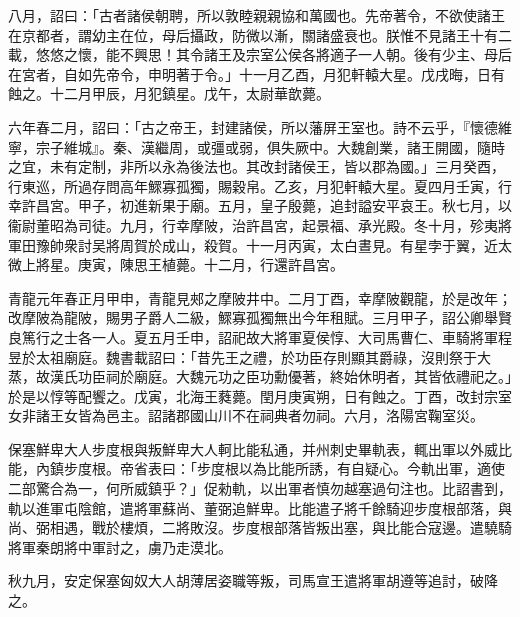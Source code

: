 \begin{pinyinscope}
八月，詔曰：「古者諸侯朝聘，所以敦睦親親協和萬國也。先帝著令，不欲使諸王在京都者，謂幼主在位，母后攝政，防微以漸，關諸盛衰也。朕惟不見諸王十有二載，悠悠之懷，能不興思！其令諸王及宗室公侯各將適子一人朝。後有少主、母后在宮者，自如先帝令，申明著于令。」十一月乙酉，月犯軒轅大星。戊戌晦，日有蝕之。十二月甲辰，月犯鎮星。戊午，太尉華歆薨。

六年春二月，詔曰：「古之帝王，封建諸侯，所以藩屏王室也。詩不云乎，『懷德維寧，宗子維城』。秦、漢繼周，或彊或弱，俱失厥中。大魏創業，諸王開國，隨時之宜，未有定制，非所以永為後法也。其改封諸侯王，皆以郡為國。」三月癸酉，行東巡，所過存問高年鰥寡孤獨，賜穀帛。乙亥，月犯軒轅大星。夏四月壬寅，行幸許昌宮。甲子，初進新果于廟。五月，皇子殷薨，追封謚安平哀王。秋七月，以衞尉董昭為司徒。九月，行幸摩陂，治許昌宮，起景福、承光殿。冬十月，殄夷將軍田豫帥衆討吴將周賀於成山，殺賀。十一月丙寅，太白晝見。有星孛于翼，近太微上將星。庚寅，陳思王植薨。十二月，行還許昌宮。

青龍元年春正月甲申，青龍見郟之摩陂井中。二月丁酉，幸摩陂觀龍，於是改年；改摩陂為龍陂，賜男子爵人二級，鰥寡孤獨無出今年租賦。三月甲子，詔公卿舉賢良篤行之士各一人。夏五月壬申，詔祀故大將軍夏侯惇、大司馬曹仁、車騎將軍程昱於太祖廟庭。魏書載詔曰：「昔先王之禮，於功臣存則顯其爵祿，沒則祭于大蒸，故漢氏功臣祠於廟庭。大魏元功之臣功勳優著，終始休明者，其皆依禮祀之。」於是以惇等配饗之。戊寅，北海王蕤薨。閏月庚寅朔，日有蝕之。丁酉，改封宗室女非諸王女皆為邑主。詔諸郡國山川不在祠典者勿祠。六月，洛陽宮鞠室災。

保塞鮮卑大人步度根與叛鮮卑大人軻比能私通，并州刺史畢軌表，輒出軍以外威比能，內鎮步度根。帝省表曰：「步度根以為比能所誘，有自疑心。今軌出軍，適使二部驚合為一，何所威鎮乎？」促勑軌，以出軍者慎勿越塞過句注也。比詔書到，軌以進軍屯陰館，遣將軍蘇尚、董弼追鮮卑。比能遣子將千餘騎迎步度根部落，與尚、弼相遇，戰於樓煩，二將敗沒。步度根部落皆叛出塞，與比能合寇邊。遣驍騎將軍秦朗將中軍討之，虜乃走漠北。

秋九月，安定保塞匈奴大人胡薄居姿職等叛，司馬宣王遣將軍胡遵等追討，破降之。


\end{pinyinscope}
